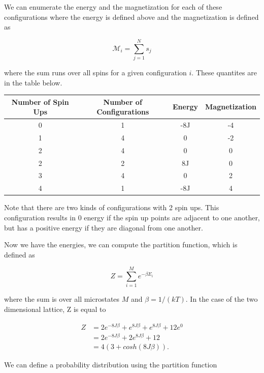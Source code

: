 \documentclass[%
oneside,                 %
final,                   %
10pt]{article}
\begin{document}
We can enumerate the energy and the magnetization for each of these configurations where the energy is defined above and the magnetization is defined as 

\begin{equation*}
\mathcal{M}_i = \sum_{j=1}^N s_j
\end{equation*}

where the sum runs over all spins for a given configuration $i$.  These quantites are in the table below.

\begin{center} 
\begin{tabular}{ |c|c|c|c| }
\hline
Number of Spin Ups & Number of Configurations & Energy & Magnetization \\
\hline
0 & 1 & -8J  & -4\\ 
1& 4  & 0  & -2\\ 
2 & 4 & 0  & 0\\ 
2 & 2 & 8J & 0 \\
3 & 4 & 0  & 2\\ 
4 & 1 & -8J  & 4\\ 
\hline
\end{tabular}
\label{table:test}
\end{center}

Note that there are two kinds of configurations with 2 spin ups.  This configuration results in 0 energy if the spin up points are adjacent to one another, but has a positive energy if they are diagonal from one another.

Now we have the energies, we can compute the partition function, which is defined as

\begin{equation*}
Z=\sum_{i=1}^M e^{-\beta E_i}
\end{equation*}

where the sum is over all microstates $M$ and $\beta = 1/(kT)$. In the case of the two dimensional lattice, Z is equal to

\begin{equation*}
\begin{split}
Z & =2e^{-8J \beta} +e^{8J \beta} + e^{8J \beta} + 12 e^{0}\\
& = 2e^{-8J \beta} +2e^{8J \beta}+12\\
& = 4 (3+cosh(8 J \beta)).
\end{split}
\end{equation*}

We can define a probability distribution using the partition function
\end{document}
